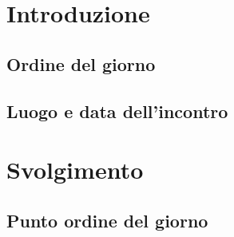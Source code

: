 \section{Introduzione}

\subsection{Ordine del giorno}

\subsection{Luogo e data dell'incontro}

\section{Svolgimento}

\subsection{Punto ordine del giorno}
